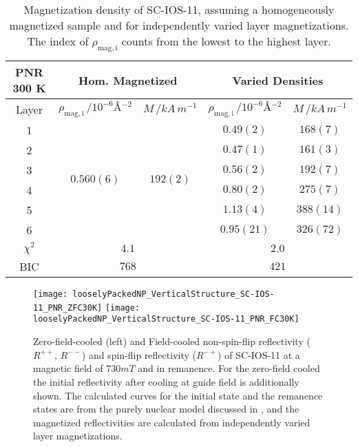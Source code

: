 \documentclass[\main/dresen_thesis.tex]{subfiles}
\begin{document}
  \begin{table}[!htbp]
    \centering
    \caption{\label{tab:looselyPackedNP:layers:pnrSCIOS300K500mT}Magnetization density of SC-IOS-11, assuming a homogeneously magnetized sample and for independently varied layer magnetizations. The index of $\rho_\mathrm{mag, i}$ counts from the lowest to the highest layer.}
    \begin{tabular}{ c | c | c | c | c}
      \rule{0pt}{2ex} \textbf{PNR \@ 300 K}  & \multicolumn{2}{c}{Hom. Magnetized} & \multicolumn{2}{c}{Varied Densities} \\
      \hline
      Layer     & $\rho_\mathrm{mag, i} \, / \unit{10^{-6} \angstrom^{-2}}$ & $M \, / \unit{kA \, m^{-1}}$ & $\rho_\mathrm{mag, i} \, / \unit{10^{-6} \angstrom^{-2}}$ & $M \, / \unit{kA \, m^{-1}}$\\
      \hline
      1         & \multirow{6}{*}{$0.560(6)$} & \multirow{6}{*}{$192(2)$}   & $0.49(2)$ & $168(7)$\\
      2         &                             &                             & $0.47(1)$ & $161(3)$\\
      3         &                             &                             & $0.56(2)$ & $192(7)$\\
      4         &                             &                             & $0.80(2)$ & $275(7)$\\
      5         &                             &                             & $1.13(4)$ & $388(14)$\\
      6         &                             &                             & $0.95(21)$& $326(72)$\\
      \hline
      $\chi^2$  & \multicolumn{2}{c}{$4.1$}   & \multicolumn{2}{c}{$2.0$}\\
      BIC       & \multicolumn{2}{c}{$768$}   & \multicolumn{2}{c}{$421$}\\
      \hline
    \end{tabular}
  \end{table}

  \begin{figure}[tb]
    \centering
    \texttt{[image: looselyPackedNP\_VerticalStructure\_SC-IOS-11\_PNR\_ZFC30K]}
    \texttt{[image: looselyPackedNP\_VerticalStructure\_SC-IOS-11\_PNR\_FC30K]}
    \caption{\label{fig:looselyPackedNP:layer:pnrZFCFCIOS11}Zero-field-cooled (left) and Field-cooled non-spin-flip reflectivity ($R^{++},\,R^{--}$) and spin-flip reflectivity ($R^{-+}$) of SC-IOS-11 at a magnetic field of $730 \unit{mT}$ and in remanence. For the zero-field cooled the initial reflectivity after cooling at guide field is additionally shown. The calculated curves for the initial state and the remanence states are from the purely nuclear model discussed in , and the magnetized reflectivities are calculated from independently varied layer magnetizations.}
  \end{figure}
\end{document}
